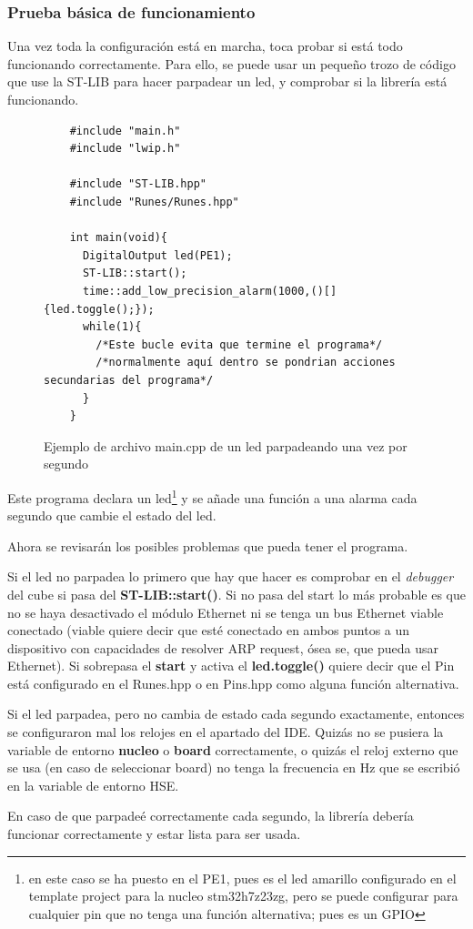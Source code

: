 \documentclass{report}
\begin{document}
\subsubsection{Prueba básica de funcionamiento}
Una vez toda la configuración está en marcha, toca probar si está todo funcionando correctamente. Para ello, se puede usar un pequeño trozo de código que use la ST-LIB para hacer parpadear un led, y comprobar si la librería está funcionando. \par 
\begin{figure}[h]
  \begin{lstlisting}
    #include "main.h"
    #include "lwip.h"

    #include "ST-LIB.hpp"
    #include "Runes/Runes.hpp"

    int main(void){
      DigitalOutput led(PE1);
      ST-LIB::start();
      time::add_low_precision_alarm(1000,()[]{led.toggle();});
      while(1){
        /*Este bucle evita que termine el programa*/
        /*normalmente aquí dentro se pondrian acciones secundarias del programa*/
      }
    }
  \end{lstlisting}
\caption{Ejemplo de archivo main.cpp de un led parpadeando una vez por segundo}
\label{BlinkyCode}
\end{figure}
\par \vspace{0.3cm}
Este programa declara un led\footnote{en este caso se ha puesto en el PE1, pues es el led amarillo configurado en el template project para la nucleo stm32h7z23zg, pero se puede configurar para cualquier pin que no tenga una función alternativa; pues es un GPIO} y se añade una función a una alarma cada segundo que cambie el estado del led. \par 
Ahora se revisarán los posibles problemas que pueda tener el programa. 
\par \vspace{0.3cm}
Si el led no parpadea lo primero que hay que hacer es comprobar en el \textit{debugger} del cube si pasa del \textbf{ST-LIB::start()}. Si no pasa del start lo más probable es que no se haya desactivado el módulo Ethernet ni se tenga un bus Ethernet viable conectado (viable quiere decir que esté conectado en ambos puntos a un dispositivo con capacidades de resolver ARP request, ósea se, que pueda usar Ethernet). Si sobrepasa el \textbf{start} y activa el \textbf{led.toggle()} quiere decir que el Pin está configurado en el Runes.hpp o en Pins.hpp como alguna función alternativa. 
\par \vspace{0.3cm}
Si el led parpadea, pero no cambia de estado cada segundo exactamente, entonces se configuraron mal los relojes en el apartado del IDE. Quizás no se pusiera la variable de entorno \textbf{nucleo} o \textbf{board} correctamente, o quizás el reloj externo que se usa (en caso de seleccionar board) no tenga la frecuencia en Hz que se escribió en la variable de entorno HSE. 
\par \vspace{0.3cm}
En caso de que parpadeé correctamente cada segundo, la librería debería funcionar correctamente y estar lista para ser usada. 
\end{document}
